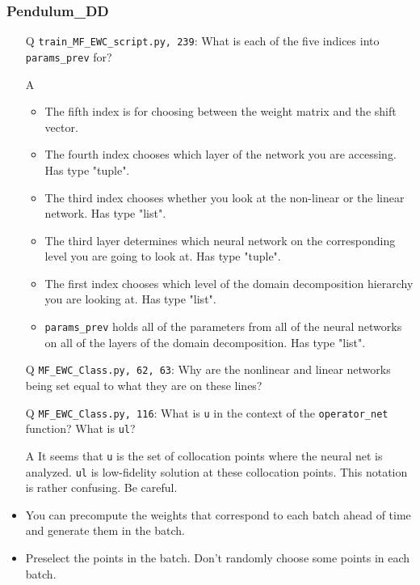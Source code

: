 \documentclass{article}
\begin{document}
\subsubsection*{Pendulum\_DD}
\begin{itemize}
	\item[Q] \verb|train_MF_EWC_script.py, 239|: What is each of the five indices into \verb|params_prev| for?
	\item[A]
	\begin{itemize}
		\item The fifth index is for choosing between the weight matrix and the shift vector. 
		\item The fourth index chooses which layer of the network you are accessing. Has type "tuple".
		\item The third index chooses whether you look at the non-linear or the linear network. Has type "list".
		\item The third layer determines which neural network on the corresponding level you are going to look at. Has type "tuple".
		\item The first index chooses which level of the domain decomposition hierarchy you are looking at. Has type "list".
		\item \verb|params_prev| holds all of the parameters from all of the neural networks on all of the layers of the domain decomposition. Has type "list".
	\end{itemize}
	\item[Q] \verb|MF_EWC_Class.py, 62, 63|: Why are the nonlinear and linear networks being set equal to what they are on these lines?
	\item[Q] \verb|MF_EWC_Class.py, 116|: What is \verb|u| in the context of the \verb|operator_net| function? What is \verb|ul|?
	\item[A] It seems that \verb|u| is the set of collocation points where the neural net is analyzed. \verb|ul| is low-fidelity solution at these collocation points. This notation is rather confusing. Be careful.
\end{itemize}


\begin{itemize}
\item You can precompute the weights that correspond to each batch ahead of time and generate them in the batch.
\item Preselect the points in the batch. Don't randomly choose some points in each batch.
\end{itemize}
\end{document}
